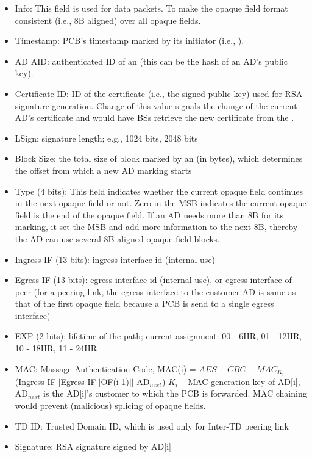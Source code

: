 \begin{itemize}
\item{Info: }This field is used for data packets. To make the opaque field format consistent (i.e., 8B aligned) over all opaque fields.
\item{Timestamp: }PCB's timestamp marked by its initiator (i.e., \TDC \BS).
\item{AD AID: } authenticated ID of an \AD (this can be the hash of an AD's public key).
\item{Certificate ID: } ID of the certificate (i.e., the signed public key) used for RSA signature generation. Change of this value signals the change of the current AD's certificate and would have BSs retrieve the new certificate from the \CS.
\item{LSign: } signature length; e.g., 1024 bits, 2048 bits
\item{Block Size: } the total size of block marked by an \AD (in bytes), which determines the offset from which a new AD marking starts
\item{Type (4 bits): } This field indicates whether the current opaque field continues in the next opaque field or not. Zero in the MSB indicates the current opaque field is the end of the opaque field. If an AD needs more than 8B for its marking, it set the MSB and add more information to the next 8B, thereby the AD can use several 8B-aligned opaque field blocks. 
\item{Ingress IF (13 bits): } ingress interface id (internal use)
\item{Egress IF (13 bits): } egress interface id (internal use), or egress interface of peer (for a peering link, the egress interface to the customer AD is same as that of the first opaque field because a PCB is send to a single egress interface)
\item{EXP (2 bits): } lifetime of the path; current assignment: 00 - 6HR, 01 - 12HR, 10 - 18HR, 11 - 24HR
\item{MAC: } Massage Authentication Code, MAC(i) = $AES-CBC-MAC_{K_i}$(Ingress IF$||$Egress IF$||$OF(i-1)$||$ AD$_{next}$) \newline
	$K_i$ – MAC generation key of AD[i], AD$_{next}$ is the AD[i]'s customer to which the PCB is forwarded. MAC chaining would prevent (malicious) splicing of opaque fields.
\item{TD ID: } Trusted Domain ID, which is used only for Inter-TD peering link
\item{Signature: } RSA signature signed by AD[i]
\end{itemize}

